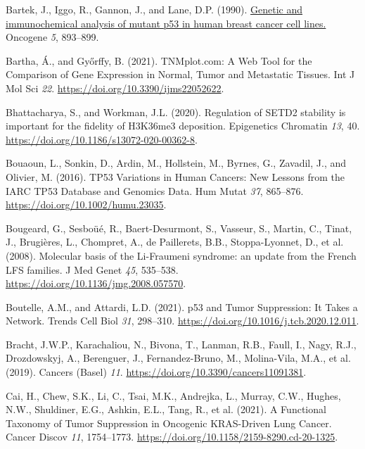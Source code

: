 \begin{CSLReferences}{0}{0}
\leavevmode{}%
Bartek, J., Iggo, R., Gannon, J., and Lane, D.P. (1990). \href{https://www.ncbi.nlm.nih.gov/pubmed/1694291}{Genetic and immunochemical analysis of mutant p53 in human breast cancer cell lines.} Oncogene \emph{5}, 893--899.

\leavevmode{}%
Bartha, Á., and Győrffy, B. (2021). TNMplot.com: A Web Tool for the Comparison of Gene Expression in Normal, Tumor and Metastatic Tissues. Int J Mol Sci \emph{22}. \url{https://doi.org/10.3390/ijms22052622}.

\leavevmode{}%
Bhattacharya, S., and Workman, J.L. (2020). Regulation of SETD2 stability is important for the fidelity of H3K36me3 deposition. Epigenetics Chromatin \emph{13}, 40. \url{https://doi.org/10.1186/s13072-020-00362-8}.

\leavevmode{}%
Bouaoun, L., Sonkin, D., Ardin, M., Hollstein, M., Byrnes, G., Zavadil, J., and Olivier, M. (2016). TP53 Variations in Human Cancers: New Lessons from the IARC TP53 Database and Genomics Data. Hum Mutat \emph{37}, 865--876. \url{https://doi.org/10.1002/humu.23035}.

\leavevmode{}%
Bougeard, G., Sesboüé, R., Baert-Desurmont, S., Vasseur, S., Martin, C., Tinat, J., Brugières, L., Chompret, A., de Paillerets, B.B., Stoppa-Lyonnet, D., et al. (2008). Molecular basis of the Li-Fraumeni syndrome: an update from the French LFS families. J Med Genet \emph{45}, 535--538. \url{https://doi.org/10.1136/jmg.2008.057570}.

\leavevmode{}%
Boutelle, A.M., and Attardi, L.D. (2021). p53 and Tumor Suppression: It Takes a Network. Trends Cell Biol \emph{31}, 298--310. \url{https://doi.org/10.1016/j.tcb.2020.12.011}.

\leavevmode{}%
Bracht, J.W.P., Karachaliou, N., Bivona, T., Lanman, R.B., Faull, I., Nagy, R.J., Drozdowskyj, A., Berenguer, J., Fernandez-Bruno, M., Molina-Vila, M.A., et al. (2019). Cancers (Basel) \emph{11}. \url{https://doi.org/10.3390/cancers11091381}.

\leavevmode{}%
Cai, H., Chew, S.K., Li, C., Tsai, M.K., Andrejka, L., Murray, C.W., Hughes, N.W., Shuldiner, E.G., Ashkin, E.L., Tang, R., et al. (2021). A Functional Taxonomy of Tumor Suppression in Oncogenic KRAS-Driven Lung Cancer. Cancer Discov \emph{11}, 1754--1773. \url{https://doi.org/10.1158/2159-8290.cd-20-1325}.


\end{CSLReferences}
